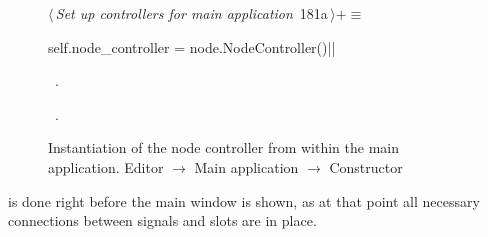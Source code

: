 \documentclass[%
    a4paper,    %
    justified,  %
    nobib,      %
    openany     %
]{tufte-book}
\makeatletter
\renewcommand{\label}[1]{\@tufte@label{##1}}%
\makeatother
\begin{document}
\begin{figure}[!htbp]
\begin{flushleft} \small
\begin{minipage}{\linewidth}\label{scrap152}\raggedright\small
{} $\langle\,${\itshape Set up controllers for main application}\nobreak\ {\footnotesize {181a}}$\,\rangle+\equiv$
\vspace{-1ex}
\begin{pythoncode}
self.node_controller = node.NodeController()|\NWsep|
\end{pythoncode}
\vspace{1.5ex}
\footnotesize
\begin{list}{}{\setlength{\itemsep}{-\parsep}\setlength{\itemindent}{-\leftmargin}}
\item \NWtxtMacroDefBy\ .
\item \NWtxtMacroRefIn\ .

\item{}
\end{list}
\end{minipage}\vspace{4ex}
\end{flushleft}
\caption{Instantiation of the node controller from within the main application.
  \newline{}\newline{}Editor $\rightarrow$ Main application $\rightarrow$
  Constructor}
\end{figure}

 is done right before the main window is
shown, as at that point all necessary connections between signals and slots are
in place.
\end{document}
